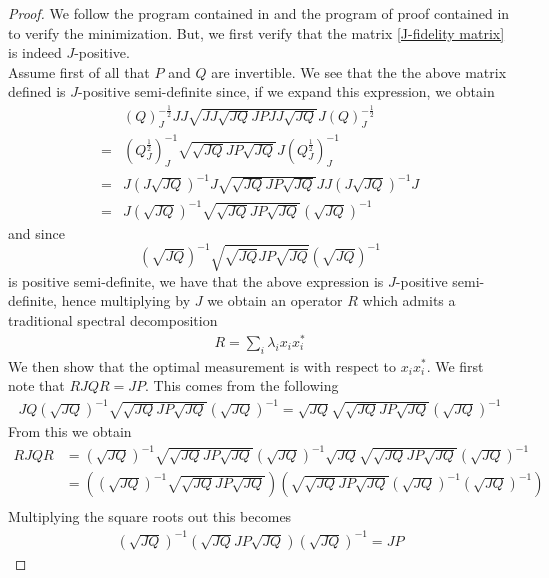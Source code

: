 \documentclass{amsart}
\numberwithin{equation}{section}
\theoremstyle{definition}
\theoremstyle{plain}
\theoremstyle{solutionstyle}
\begin{document}
\begin{proof}
We follow the program contained in \cite[pp.~153--155]{Watrous_2018} and the program of proof contained in \cite{wilde2015lecture16} to verify the minimization. But, we first verify that the matrix \ref{J-fidelity matrix}  is indeed $J$-positive.\\
    Assume first of all that $P$ and $Q$ are invertible. We see that the the above matrix defined is $J$-positive semi-definite since, if we expand this expression, we obtain
    \begin{align*}
       &(Q)_J^{-\frac{1}{2}}JJ\sqrt{JJ\sqrt{JQ}JPJJ\sqrt{JQ}}J(Q)_J^{-\frac{1}{2}}\\
       =& (Q_J^{\frac{1}{2}})_J^{-1}\sqrt{\sqrt{JQ}JP \sqrt{JQ}}J(Q_J^{\frac{1}{2}})_J^{-1}\\
       =& J(J\sqrt{JQ})^{-1}J\sqrt{\sqrt{JQ}JP \sqrt{JQ}}JJ(J\sqrt{JQ})^{-1}J\\
       =& J(\sqrt{JQ})^{-1}\sqrt{\sqrt{JQ}JP\sqrt{JQ}}(\sqrt{JQ})^{-1}
    \end{align*}
    and since 
    \begin{equation*}(\sqrt{JQ})^{-1}\sqrt{\sqrt{JQ}JP\sqrt{JQ}}(\sqrt{JQ})^{-1}\end{equation*} 
    is positive semi-definite, we have that the above expression is $J$-positive semi-definite, hence multiplying by $J$ we obtain an operator $R$ which admits a traditional spectral decomposition 
    \begin{align*}
        R=\sum_{i}\lambda_ix_ix_i^*
    \end{align*}
    We then show that the optimal measurement is with respect to $x_ix_i^*$. We first note that $RJQR=JP$. This comes from the following 
    \begin{align*}
        JQ\left(\sqrt{JQ}\right)^{-1}\sqrt{\sqrt{JQ}JP\sqrt{JQ}}\left(\sqrt{JQ}\right)^{-1}= \sqrt{JQ}\sqrt{\sqrt{JQ}JP\sqrt{JQ}}\left(\sqrt{JQ}\right)^{-1}
    \end{align*}
    From this we obtain
    \begin{align*}
        RJQR&=\left(\sqrt{JQ}\right)^{-1}\sqrt{\sqrt{JQ}JP\sqrt{JQ}}\left(\sqrt{JQ}\right)^{-1}\sqrt{JQ}\sqrt{\sqrt{JQ}JP\sqrt{JQ}}\left(\sqrt{JQ}\right)^{-1}\\
        &=\left(\left(\sqrt{JQ}\right)^{-1}\sqrt{\sqrt{JQ}JP\sqrt{JQ}}\right)\left(\sqrt{\sqrt{JQ}JP\sqrt{JQ}}\left(\sqrt{JQ}\right)^{-1}\left(\sqrt{JQ}\right)^{-1}\right)\\
    \end{align*}
    Multiplying the square roots out this becomes
    \begin{align*}
        \left(\sqrt{JQ}\right)^{-1}\left(\sqrt{JQ}JP\sqrt{JQ}\right)\left(\sqrt{JQ}\right)^{-1}=JP
    \end{align*}
    

\end{proof}
\end{document}
